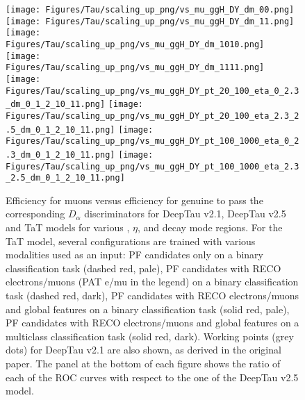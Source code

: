\begin{figure}[H]
    \centering
    \texttt{[image: Figures/Tau/scaling\_up\_png/vs\_mu\_ggH\_DY\_dm\_00.png]}
    \texttt{[image: Figures/Tau/scaling\_up\_png/vs\_mu\_ggH\_DY\_dm\_11.png]}
    \texttt{[image: Figures/Tau/scaling\_up\_png/vs\_mu\_ggH\_DY\_dm\_1010.png]}
    \texttt{[image: Figures/Tau/scaling\_up\_png/vs\_mu\_ggH\_DY\_dm\_1111.png]}
    \texttt{[image: Figures/Tau/scaling\_up\_png/vs\_mu\_ggH\_DY\_pt\_20\_100\_eta\_0\_2.3\_dm\_0\_1\_2\_10\_11.png]}
    \texttt{[image: Figures/Tau/scaling\_up\_png/vs\_mu\_ggH\_DY\_pt\_20\_100\_eta\_2.3\_2.5\_dm\_0\_1\_2\_10\_11.png]}
    \texttt{[image: Figures/Tau/scaling\_up\_png/vs\_mu\_ggH\_DY\_pt\_100\_1000\_eta\_0\_2.3\_dm\_0\_1\_2\_10\_11.png]}
    \texttt{[image: Figures/Tau/scaling\_up\_png/vs\_mu\_ggH\_DY\_pt\_100\_1000\_eta\_2.3\_2.5\_dm\_0\_1\_2\_10\_11.png]}
    \caption{Efficiency for muons versus efficiency for genuine \tauh to pass the corresponding $D_\alpha$ discriminators for DeepTau v2.1, DeepTau v2.5 and TaT models for various \pt, $\eta$, and \tauh decay mode regions. For the TaT model, several configurations are trained with various modalities used as an input: PF candidates only on a binary classification task (dashed red, pale), PF candidates with RECO electrons/muons (PAT e/mu in the legend) on a binary classification task (dashed red, dark), PF candidates with RECO electrons/muons and global features on a binary classification task (solid red, pale), PF candidates with RECO electrons/muons and global features on a multiclass classification task (solid red, dark). Working points (grey dots) for DeepTau v2.1 are also shown, as derived in the original paper. The panel at the bottom of each figure shows the ratio of each of the ROC curves with respect to the one of the DeepTau v2.5 model.}
\end{figure}

